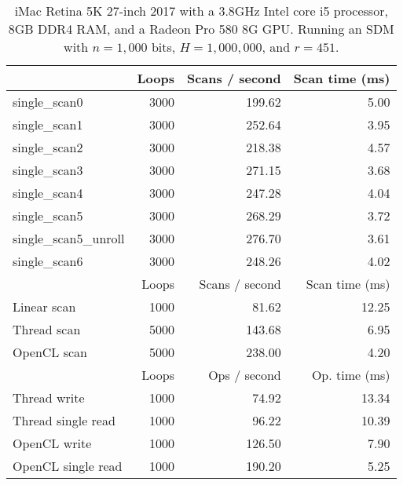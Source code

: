 \begin{table}[!htb]
\centering
\begin{tabular}{| l | r | r | r |}
    \hline
    & Loops & Scans / second & Scan time (ms) \\ \hline
    single\_scan0 & 3000 & 199.62 & 5.00 \\
    single\_scan1 & 3000 & 252.64 & 3.95 \\
    single\_scan2 & 3000 & 218.38 & 4.57 \\
    single\_scan3 & 3000 & 271.15 & 3.68 \\
    single\_scan4 & 3000 & 247.28 & 4.04 \\
    single\_scan5 & 3000 & 268.29 & 3.72 \\
    single\_scan5\_unroll & 3000 & 276.70 & 3.61 \\
    single\_scan6 & 3000 & 248.26 & 4.02 \\ \hline
    \hline
    & Loops & Scans / second & Scan time (ms) \\ \hline
    Linear scan & 1000 & 81.62 & 12.25 \\
    Thread scan & 5000 & 143.68 & 6.95 \\
    OpenCL scan & 5000 & 238.00 & 4.20 \\ \hline
    \hline
    & Loops & Ops / second & Op. time (ms) \\ \hline
    Thread write & 1000 & 74.92 & 13.34 \\
    Thread single read & 1000 & 96.22 & 10.39 \\
    OpenCL write & 1000 & 126.50 & 7.90 \\
    OpenCL single read & 1000 & 190.20 & 5.25 \\
    \hline
\end{tabular}
\caption{iMac Retina 5K 27-inch 2017 with a 3.8GHz Intel core i5 processor, 8GB DDR4 RAM, and a Radeon Pro 580 8G GPU. Running an SDM with $n=1,000$ bits, $H=1,000,000$, and $r=451$.
\label{tab:perf-imac-1000}}
\end{table}

